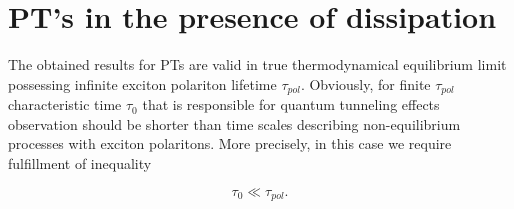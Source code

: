 \documentclass[aps, pre, preprint, groupedaddress, superscriptaddress, showkeys, showpacs] {revtex4-1}
\begin{document}
%
%
%
%
\section{PT's in the presence of dissipation 
\label{sec:non-equilibrium}}

The obtained results for PTs are valid in true thermodynamical equilibrium limit possessing infinite exciton polariton lifetime $\tau_{pol}$. Obviously, for finite $\tau_{pol}$  characteristic time $\tau_0$ that is responsible for quantum tunneling effects observation  should be shorter than time scales describing non-equilibrium processes with exciton polaritons. More precisely, in this case we require fulfillment of  inequality 
 
\begin{equation}
 \tau_{0}\ll\tau_{pol}.
 \label{eq:lifetime}  
\end{equation}
\end{document}

